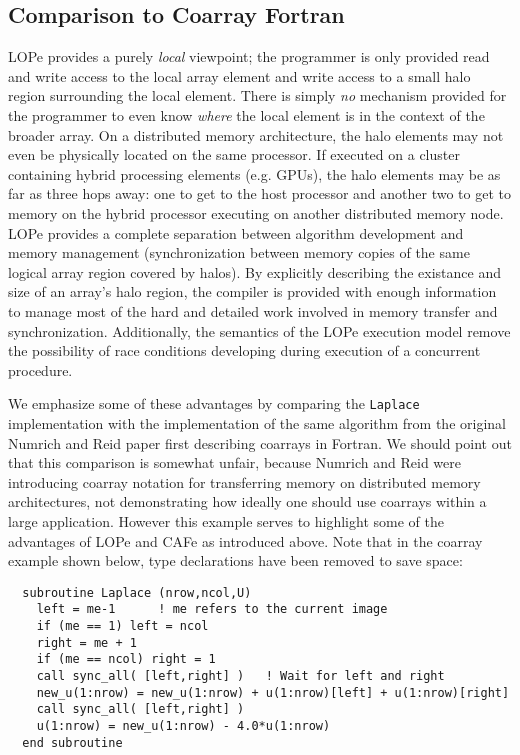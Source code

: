 \subsection{Comparison to Coarray Fortran}

LOPe provides a purely \emph{local} viewpoint; the programmer is only provided read and write access
to the local array element and write access to a small halo region surrounding the local element.
There is simply \emph{no} mechanism provided for the programmer to even know \emph{where} the local
element is in the context of the broader array.  On a distributed memory architecture, the halo
elements may not even be physically located on the same processor.  If executed on a cluster
containing hybrid processing elements (e.g. GPUs), the halo elements may be as far as three hops
away: one to get to the host processor and another two to get to memory on the hybrid processor
executing on another distributed memory node.  LOPe provides a complete separation between algorithm
development and memory management (synchronization between memory copies of the same logical
array region covered by halos).  By explicitly describing the existance and size of an array's halo
region, the compiler is provided with enough information to manage most of the hard and detailed
work involved in memory transfer and synchronization.  Additionally, the semantics of the LOPe
execution model remove the possibility of race conditions developing during execution of a
concurrent procedure.

We emphasize some of these advantages by comparing the \texttt{Laplace} implementation with the
implementation of the same algorithm from the original Numrich and Reid paper first describing
coarrays in Fortran.  We should point out that this comparison is somewhat unfair, because Numrich
and Reid were introducing coarray notation for transferring memory on distributed memory
architectures, not demonstrating how ideally one should use coarrays within a large application.
However this example serves
to highlight some of the advantages of LOPe and CAFe as introduced above.  Note that in the coarray
example shown below, type declarations have been removed to save space:
{\small \begin{verbatim}
  subroutine Laplace (nrow,ncol,U)
    left = me-1      ! me refers to the current image
    if (me == 1) left = ncol
    right = me + 1
    if (me == ncol) right = 1
    call sync_all( [left,right] )   ! Wait for left and right
    new_u(1:nrow) = new_u(1:nrow) + u(1:nrow)[left] + u(1:nrow)[right]
    call sync_all( [left,right] )
    u(1:nrow) = new_u(1:nrow) - 4.0*u(1:nrow)
  end subroutine
\end{verbatim}}

